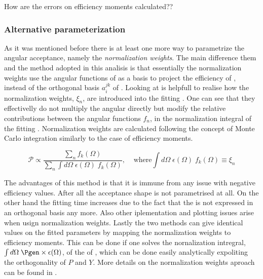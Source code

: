 {\color{red} How are the errors on efficiency moments calculated??}\\

\subsubsection{Alternative parameterization}
As it was mentioned before there is at least one more way to parametrize the angular acceptance, namely the \emph{normalization weights}.
The main difference them and the method adopted in this analisis is that essentially the normalization weights use the angular functions
of  as a basis to project the efficiency of , instead of the orthogonal basis $a_i^{jk}$ of .
Looking at  is helpfull to realise how the normalization weights, $\xi_n$, are introduced into the fitting \pdf. 
One can see that they effectivelly do not multiply the angular \pdf directly but modify the relative contributions between the angular functions
$f_n$, in the normalization integral of the fitting \pdf. Normalization weights are calculated following the concept of Monte Carlo integration
similarly to the case of efficiency moments.

\begin{equation}
  \mathcal{P} \propto \frac{\sum_n f_k(\Omega)}{\sum_n \int d\Omega \; \epsilon(\Omega) \; f_k(\Omega)}, \;\;\;\;\text{where} \int d\Omega \; \epsilon(\Omega) \; f_k(\Omega) \equiv \xi_n 
  \label{norm_weights_pdf}
\end{equation}

The advantages of this method is that it is immune from any issue with negative efficiency values. After all the acceptance shape is not parametrised at all.
On the other hand the fitting time increases due to the fact that the \pdf is not expressed in an orthogonal basis any more. Also other
iplementation and plotting issues arise when usign normalization weights. Lastly the two methods can give identical values on the fitted parameters by mapping 
the normalization weights to efficiency moments. This can be done if one solves the nornalization intregral, $\int d\Omega\;\Pgen\times\epsilon(\Omega)$,
of the \pdf of , which can be done easily analytically expoliting the orthogonality of $P$ and $Y$. More details on the normalization
weights aproach can be found in \cite{jeroenThesis}. 

